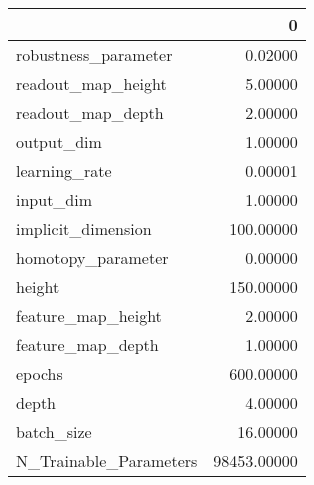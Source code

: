\begin{tabular}{lr}
\toprule
{} &            0 \\
\midrule
robustness\_parameter   &      0.02000 \\
readout\_map\_height     &      5.00000 \\
readout\_map\_depth      &      2.00000 \\
output\_dim             &      1.00000 \\
learning\_rate          &      0.00001 \\
input\_dim              &      1.00000 \\
implicit\_dimension     &    100.00000 \\
homotopy\_parameter     &      0.00000 \\
height                 &    150.00000 \\
feature\_map\_height     &      2.00000 \\
feature\_map\_depth      &      1.00000 \\
epochs                 &    600.00000 \\
depth                  &      4.00000 \\
batch\_size             &     16.00000 \\
N\_Trainable\_Parameters &  98453.00000 \\
\bottomrule
\end{tabular}
